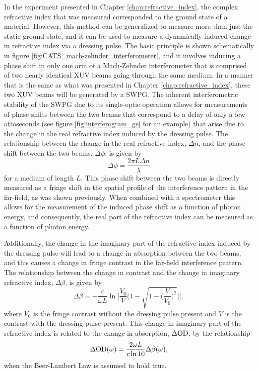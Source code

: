 In the experiment presented in Chapter \ref{chap:refractive_index}, the complex refractive index that was measured corresponded to the ground state of a material.  However, this method can be generalized to measure more than just the static ground state, and it can be used to measure a dynamically induced change in refractive index via a dressing pulse.  The basic principle is shown schematically in figure \ref{fig:CATS_mach-zehnder_interferometer}, and it involves inducing a phase shift in only one arm of a Mach-Zehnder interferometer that is comprised of two nearly identical XUV beams going through the same medium. In a manner that is the same as what was presented in Chapter \ref{chap:refractive_index}, these two XUV beams will be generated by a SWPG.  The inherent interferometric stability of the SWPG due to its single-optic operation allows for measurements of phase shifts between the two beams that correspond to a delay of only a few attoseconds (see figure \ref{fig:interferogram_ge} for an example) that arise due to the change in the real refractive index induced by the dressing pulse.  The relationship between the change in the real refractive index, $\Delta n$, and the phase shift between the two beams, $\Delta\phi$, is given by
\begin{equation}
	\label{eqn:phase_shift_dn}
	\Delta \phi = \frac{2\pi L \Delta n}{\lambda}
\end{equation}
for a medium of length $L$.  This phase shift between the two beams is directly measured as a fringe shift in the spatial profile of the interference pattern in the far-field, as was shown previously. When combined with a spectrometer this allows for the measurement of the induced phase shift as a function of photon energy, and consequently, the real part of the refractive index can be measured as a function of photon energy.  

Additionally, the change in the imaginary part of the refractive index induced by the dressing pulse will lead to a change in absorption between the two beams, and this causes a change in fringe contrast in the far-field interference pattern.  The relationship between the change in contrast and the change in imaginary refractive index, $\Delta \beta$,  is given by
\begin{equation}
	\label{eqn:beta_fringe_contrast_chap_cats}
	\Delta\beta = -\frac{c}{\omega L} \ln\Bigg[\frac{V_0}{V}\Bigg(1-\sqrt{1-\bigg(\frac{V}{V_0}\bigg)^2}\Bigg)\Bigg],
\end{equation}
where $V_0$ is the fringe contrast without the dressing pulse present and $V$ is the contrast with the dressing pulse present.  This change in imaginary part of the refractive index is related to the change in absorption, $\Delta\mathrm{OD}$, by the relationship
\begin{equation}
	\label{eqn:dod_to_beta}
	\Delta\mathrm{OD}(\omega) = \frac{2 \omega L}{c \ln 10}\Delta \beta(\omega),
\end{equation}
when the Beer-Lambert Law is assumed to hold true. 

